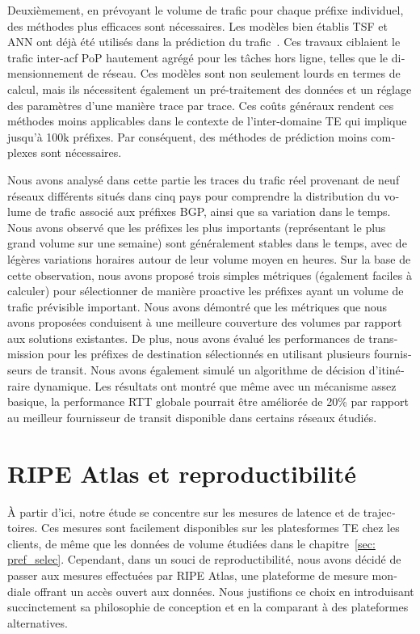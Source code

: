 \begin{otherlanguage}{french}
Deuxièmement, en prévoyant le volume de trafic pour chaque préfixe individuel, des méthodes plus efficaces sont nécessaires.
Les modèles bien établis \acf{TSF} et \acf{ANN} ont déjà été utilisés dans la prédiction du trafic~\cite{Papagiannaki2005, Cortez2006, Otoshi2013}.
Ces travaux ciblaient le trafic inter-acf {PoP} hautement agrégé pour les tâches hors ligne, telles que le dimensionnement de réseau.
Ces modèles sont non seulement lourds en termes de calcul, mais ils nécessitent également un pré-traitement des données et un réglage des paramètres d'une manière trace par trace. 
Ces coûts généraux rendent ces méthodes moins applicables dans le contexte de l'inter-domaine TE qui implique jusqu'à 100k préfixes. Par conséquent, des méthodes de prédiction moins complexes sont nécessaires.

Nous avons analysé dans cette partie les traces du trafic réel provenant de neuf réseaux différents situés dans cinq pays pour comprendre la distribution du volume de trafic associé aux préfixes BGP, ainsi que sa variation dans le temps.
Nous avons observé que les préfixes les plus importants (représentant le plus grand volume sur une semaine) sont généralement stables dans le temps, avec de légères variations horaires autour de leur volume moyen en heures.
Sur la base de cette observation, nous avons proposé trois simples
métriques (également faciles à calculer) pour sélectionner de manière proactive les préfixes ayant un volume de trafic prévisible important.
Nous avons démontré que les métriques que nous avons proposées conduisent à une meilleure couverture des volumes par rapport aux solutions existantes.
De plus, nous avons évalué les performances de transmission pour les préfixes de destination sélectionnés en utilisant plusieurs fournisseurs de transit.
Nous avons également simulé un algorithme de décision d'itinéraire dynamique.
Les résultats ont montré que même avec un mécanisme assez basique, la performance RTT globale pourrait être améliorée de 20\% par rapport au meilleur fournisseur de transit disponible dans certains réseaux étudiés.

\section{RIPE Atlas et reproductibilité}

À partir d'ici, notre étude se concentre sur les mesures de latence et de trajectoires.
Ces mesures sont facilement disponibles sur les platesformes TE chez les clients, de même que les données de volume étudiées dans le chapitre~\ref{sec: pref_selec}.
Cependant, dans un souci de reproductibilité, nous avons décidé de passer aux mesures effectuées par RIPE Atlas, une plateforme de mesure mondiale offrant un accès ouvert aux données. Nous justifions ce choix en introduisant succinctement sa philosophie de conception et en la comparant à des plateformes alternatives.


\end{otherlanguage}
